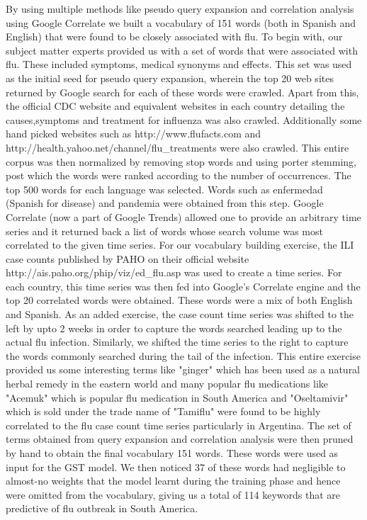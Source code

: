 
By using multiple methods like pseudo query expansion and correlation analysis using Google Correlate we built a vocabulary of 151 words (both in Spanish and English) that were found to be closely associated with flu. To begin with, our subject matter experts provided us with a set of words that were associated with flu. These included symptoms, medical synonyms and effects. This set was used as the initial seed for pseudo query expansion, wherein the top 20 web sites returned by Google search for each of these words were crawled. Apart from this, the official CDC website and equivalent websites in each country detailing the causes,symptoms and treatment for influenza was also crawled. Additionally some hand picked websites such as http://www.flufacts.com and http://health.yahoo.net/channel/flu_treatments were also crawled. This entire corpus was then normalized by removing stop words and using porter stemming, post which the words were ranked according to the number of occurrences. The top 500 words for each language was selected. Words such as enfermedad (Spanish for disease) and pandemia were obtained from this step.
Google Correlate (now a part of Google Trends) allowed one to provide an arbitrary time series and it returned back a list of words whose search volume was most correlated to the given time series. For our vocabulary building exercise, the ILI case counts published by PAHO on their official website http://ais.paho.org/phip/viz/ed_flu.asp was used to create a time series. For each country, this time series was then fed into Google's Correlate engine and the top 20 correlated words were obtained. These words were a mix of both English and Spanish. As an added exercise, the case count time series was shifted to the left by upto 2 weeks in order to capture the words searched leading up to the actual flu infection. Similarly, we shifted the time series to the right to capture the words commonly searched during the tail of the infection. This entire exercise provided us some interesting terms like "ginger" which has been used as a natural herbal remedy in the eastern world and many popular flu medications like "Acemuk" which is popular flu medication in South America and  "Oseltamivir" which is sold under the trade name of "Tamiflu" were found to be highly correlated to the flu case count time series particularly in Argentina.   
The set of terms obtained from query expansion and correlation analysis were then pruned by hand to obtain the final vocabulary 151 words. These words were used as input for the GST model. We then noticed 37 of these words had negligible to almost-no weights that the model learnt during the training phase and hence were omitted from the vocabulary, giving us a total of 114 keywords that are predictive of flu outbreak in South America.